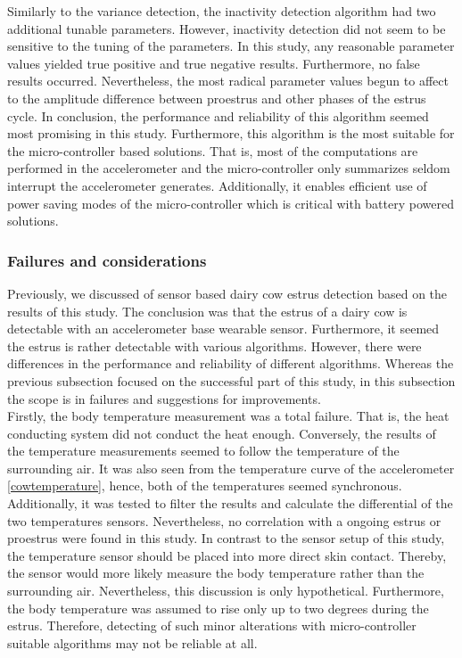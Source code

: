 \documentclass[english,12pt,a4paper,pdftex,elec,utf8]{aaltothesis}
\begin{document}
Similarly to the variance detection, the inactivity detection algorithm had two additional tunable parameters. However, inactivity detection did not seem to be sensitive to the tuning of the parameters. In this study, any reasonable parameter values yielded true positive and true negative results. Furthermore, no false results occurred. Nevertheless,  the most radical parameter values begun to affect to the amplitude difference between proestrus and other phases of the estrus cycle. In conclusion, the performance and reliability of this algorithm seemed most promising in this study. Furthermore, this algorithm is the most suitable for the micro-controller based solutions. That is, most of the computations are performed in the accelerometer and the micro-controller only summarizes seldom interrupt the accelerometer generates. Additionally, it enables efficient use of power saving modes of the micro-controller which is critical with battery powered solutions. 





\subsubsection{Failures and considerations}

Previously, we discussed of sensor based dairy cow estrus detection based on the results of this study. The conclusion was that the estrus of a dairy cow is detectable with an accelerometer base wearable sensor. Furthermore, it seemed the estrus is rather detectable with various algorithms. However, there were differences in the performance and reliability of different algorithms. Whereas the previous subsection focused on the successful part of this study, in this subsection the scope is in failures and suggestions for improvements.\\

Firstly, the body temperature measurement was a total failure. That is, the heat conducting system did not conduct the heat enough. Conversely, the results of the temperature measurements seemed to follow the temperature of the surrounding air. It was also seen from the temperature curve of the accelerometer \ref{cowtemperature}, hence, both of the temperatures seemed synchronous. Additionally, it was tested to filter the results and calculate the differential of the two temperatures sensors. Nevertheless, no correlation with a ongoing estrus or proestrus were found in this study. In contrast to the sensor setup of this study, the temperature sensor should be placed into more direct skin contact. Thereby, the sensor would more likely measure the body temperature rather than the surrounding air. Nevertheless, this discussion is only hypothetical. Furthermore, the body temperature was assumed to rise only up to two degrees during the estrus. Therefore, detecting of such minor alterations with micro-controller suitable algorithms may not be reliable at all.\\
\end{document}
